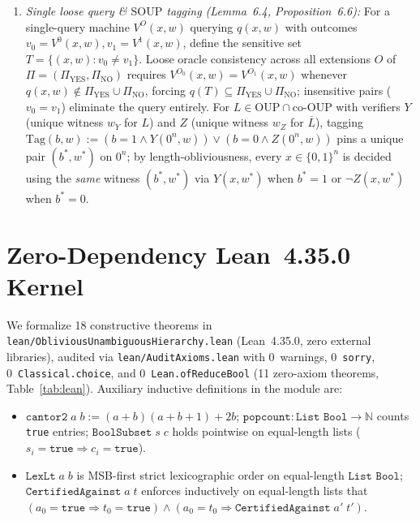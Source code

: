 \documentclass[10pt,twocolumn]{article}
\newcommand{\NN}{\mathbb{N}}
\newcommand{\OUP}{\mathrm{OUP}}
\newcommand{\SOUP}{\mathrm{SOUP}}
\begin{document}
\begin{enumerate}[leftmargin=*,nosep]
\begin{equation}
    \label{eq:dotv}
  \end{equation}
  pins $v = v_N$ on anchor $0^n$ and transfers $v_N$ by length-obliviousness to arbitrary $x \in \{0,1\}^n$, forcing $\neg V((x,w), v_N) \iff R(x,w)$ and accepting solely $(w_n, v_N)$.
  \item \emph{Single loose query \& $\SOUP$ tagging (Lemma~6.4, Proposition~6.6):} For a single-query machine $V^O(x,w)$ querying $q(x,w)$ with outcomes $v_0 = V^0(x,w), v_1 = V^1(x,w)$, define the sensitive set $T = \{(x,w) : v_0 \neq v_1\}$. Loose oracle consistency across all extensions $O$ of $\Pi = (\Pi_{\mathrm{YES}}, \Pi_{\mathrm{NO}})$ requires $V^{O_0}(x,w) = V^{O_1}(x,w)$ whenever $q(x,w) \notin \Pi_{\mathrm{YES}} \cup \Pi_{\mathrm{NO}}$, forcing $q(T) \subseteq \Pi_{\mathrm{YES}} \cup \Pi_{\mathrm{NO}}$; insensitive pairs ($v_0 = v_1$) eliminate the query entirely. For $L \in \OUP \cap \mathrm{co}\text{-}\OUP$ with verifiers $Y$ (unique witness $w_Y$ for $L$) and $Z$ (unique witness $w_Z$ for $\overline{L}$), tagging $\mathrm{Tag}(b, w) := (b=1 \land Y(0^n, w)) \lor (b=0 \land Z(0^n, w))$ pins a unique pair $(b^\ast, w^\ast)$ on $0^n$; by length-obliviousness, every $x \in \{0,1\}^n$ is decided using the \emph{same} witness $(b^\ast, w^\ast)$ via $Y(x, w^\ast)$ when $b^\ast = 1$ or $\neg Z(x, w^\ast)$ when $b^\ast = 0$.
\end{enumerate}

\section{Zero-Dependency Lean~4.35.0 Kernel}\label{sec:lean}
We formalize 18 constructive theorems in \texttt{lean/ObliviousUnambiguousHierarchy.lean} (Lean~4.35.0, zero external libraries), audited via \texttt{lean/AuditAxioms.lean} with 0~warnings, 0~\texttt{sorry}, 0~\texttt{Classical.choice}, and 0~\texttt{Lean.ofReduceBool} (11 zero-axiom theorems, Table~\ref{tab:lean}). Auxiliary inductive definitions in the module are:
\begin{itemize}[leftmargin=*,nosep]
  \item $\texttt{cantor2}\;a\;b := (a+b)(a+b+1)+2b$; $\texttt{popcount} : \texttt{List Bool} \to \NN$ counts \texttt{true} entries; $\texttt{BoolSubset}\;s\;c$ holds pointwise on equal-length lists ($s_i=\texttt{true} \Rightarrow c_i=\texttt{true}$).
  \item $\texttt{LexLt}\;a\;b$ is MSB-first strict lexicographic order on equal-length $\texttt{List Bool}$; $\texttt{CertifiedAgainst}\;a\;t$ enforces inductively on equal-length lists that $(a_0=\texttt{true} \Rightarrow t_0=\texttt{true}) \land (a_0=t_0 \Rightarrow \texttt{CertifiedAgainst}\;a'\;t')$.
\end{itemize}
\end{document}
